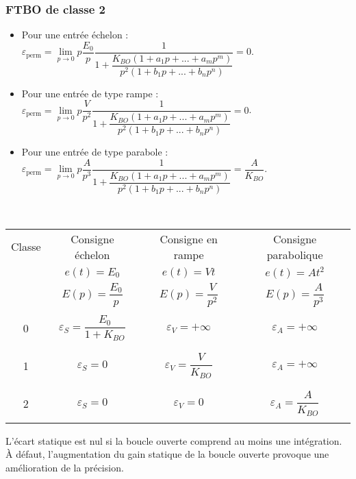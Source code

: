 \subsubsection*{FTBO de classe 2}

\begin{itemize}
\item Pour une entrée échelon : 
$\varepsilon_{\text{perm}}=\lim\limits_{p\to 0} p\dfrac{E_0}{p}\dfrac{1}{1+\dfrac{K_{BO}\left(1+a_1p+...+a_mp^m \right)}{p^{2}\left(1+b_1p+...+b_np^n\right)}} 
= 0$.
\item Pour une entrée de type rampe : 
$\varepsilon_{\text{perm}}=\lim\limits_{p\to 0} p\dfrac{V}{p^2}\dfrac{1}{1+\dfrac{K_{BO}\left(1+a_1p+...+a_mp^m \right)}{p^{2}\left(1+b_1p+...+b_np^n\right)}} 
=0$.
\item Pour une entrée de type parabole : 
$\varepsilon_{\text{perm}}=\lim\limits_{p\to 0} p\dfrac{A}{p^3}\dfrac{1}{1+\dfrac{K_{BO}\left(1+a_1p+...+a_mp^m \right)}{p^{2}\left(1+b_1p+...+b_np^n\right)}} 
=\dfrac{A}{K_{BO}}$.
\end{itemize}


\begin{resultat} ~\\

\begin{center}
\begin{tabular}{|c|c|c|c|}
\hline 
Classe & Consigne échelon & Consigne en rampe & Consigne parabolique \\
& $e(t)=E_0$ & $e(t)=V t $ & $e(t)=At^2$ \\ 
& $E(p)=\dfrac{E_0}{p}$ & $E(p)=\dfrac{V}{p^2}$ & $E(p)=\dfrac{A}{p^3}$ \\ 
\hline \hline 
&&&\\
0 & $\varepsilon_S = \dfrac{E_0}{1+K_{BO}} $ & $\varepsilon_V = +\infty$ & $\varepsilon_A = +\infty$ \\
&&&\\
\hline 
&&&\\
1 & $\varepsilon_S = 0$ & $\varepsilon_V = \dfrac{V}{K_{BO}} $ & $\varepsilon_A = +\infty$ \\
&&&\\
\hline 
&&&\\
2 & $\varepsilon_S = 0 $ & $\varepsilon_V = 0$ & $\varepsilon_A = \dfrac{A}{K_{BO}}$ \\
&&&\\
\hline 
\end{tabular}
\end{center}

\begin{remarque}
L'écart statique est nul si la boucle ouverte comprend au moins une intégration. À défaut, l'augmentation du gain statique de la boucle ouverte provoque une amélioration de la précision.
\end{remarque}

\end{resultat}




